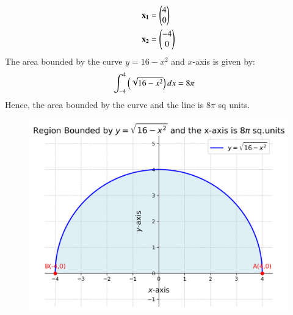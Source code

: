 \documentclass[journal,12pt,onecolumn]{IEEEtran}
\theoremstyle{remark}
\begin{document}
\begin{align}
	\mathbf{x_1} &= \begin{pmatrix}4 \\0\end{pmatrix}\\
	\mathbf{x_2} &= \begin{pmatrix}-4\\0\end{pmatrix}
\end{align}
The area bounded by the curve $y = 16-x^2$ and $x$-axis is given by:
\begin{align}
	\int_{-4}^{4}\left(\sqrt{16-x^2} \right)dx &= 8\pi 
\end{align}
Hence, the area bounded by the curve and the line is $8\pi$ sq units.\\
\begin{figure}[h]
	\centering
	\includegraphics[scale=0.7]{figs/plot.png}
	\label{Fig}
\end{figure}
\end{document}
